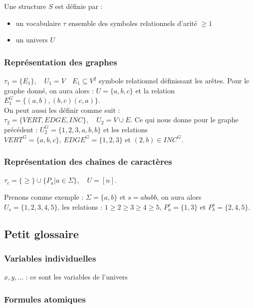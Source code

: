 \documentclass[a4paper, 11pt]{thesis}
\begin{document}
Une structure $S$ est définie par :
\begin{itemize}
    \item un vocabulaire $\tau$ ensemble des symboles relationnels d'arité $\geq 1$
    \item un univers $U$
\end{itemize}

\subsubsection{Représentation des graphes}


$\tau_1 = \{E_1\}, \quad U_1 = V \quad E_1 \subseteq V^2$ symbole relationnel définissant les
arêtes. Pour le graphe donné, on aura alors : $U = \{a, b, c\}$ et la relation $E_1^G = \{(a,b),
(b,c) (c,a)\}$.
\\

On peut aussi les définir comme suit :\\
$\tau_2 = \{ VERT, EDGE, INC \}, \quad U_2 = V \cup E $. Ce qui nous donne pour le graphe précédent
: $U_2^G = \{1,2,3,a,b,b\}$ et les relations $VERT^G = \{a, b, c\},\ EDGE^G = \{1,2,3\}$ et $(2,b) \in
INC^G$.

\subsubsection{Représentation des chaînes de caractères}

$\tau_c = \{\geq\} \cup \{P_a | a \in \Sigma\}, \quad U = [n]$.

Prenons comme exemple : $\Sigma = \{a, b\}$ et $s = ababb$, on aura alors $U_s = \{1,2,3,4,5\}$, les
relations : $1 \geq 2 \geq 3 \geq 4 \geq 5$, $P_a^s = \{1, 3\}$ et $P_b^s = \{2, 4, 5 \}$.

\subsection{Petit glossaire}

\subsubsection{Variables individuelles}

$x, y, \dots$ : ce sont les variables de l'univers

\subsubsection{Formules atomiques}
\end{document}
